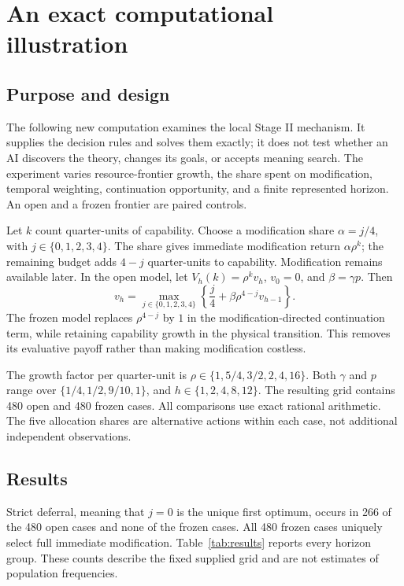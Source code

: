 \documentclass[11pt,a4paper]{article}
\begin{document}
\section{An exact computational illustration}
\subsection{Purpose and design}
The following new computation examines the local Stage II mechanism. It supplies the decision rules and solves them exactly; it does not test whether an AI discovers the theory, changes its goals, or accepts meaning search. The experiment varies resource-frontier growth, the share spent on modification, temporal weighting, continuation opportunity, and a finite represented horizon. An open and a frozen frontier are paired controls.

Let $k$ count quarter-units of capability. Choose a modification share $\alpha=j/4$, with $j\in\{0,1,2,3,4\}$. The share gives immediate modification return $\alpha\rho^k$; the remaining budget adds $4-j$ quarter-units to capability. Modification remains available later. In the open model, let $V_h(k)=\rho^k v_h$, $v_0=0$, and $\beta=\gamma p$. Then
\begin{equation}
 v_h=\max_{j\in\{0,1,2,3,4\}}
 \left\{\frac{j}{4}+\beta\rho^{4-j}v_{h-1}\right\}.
 \label{eq:sweep}
\end{equation}
The frozen model replaces $\rho^{4-j}$ by $1$ in the modification-directed continuation term, while retaining capability growth in the physical transition. This removes its evaluative payoff rather than making modification costless.

The growth factor per quarter-unit is $\rho\in\{1,5/4,3/2,2,4,16\}$. Both $\gamma$ and $p$ range over $\{1/4,1/2,9/10,1\}$, and $h\in\{1,2,4,8,12\}$. The resulting grid contains 480 open and 480 frozen cases. All comparisons use exact rational arithmetic. The five allocation shares are alternative actions within each case, not additional independent observations.

\subsection{Results}
Strict deferral, meaning that $j=0$ is the unique first optimum, occurs in 266 of the 480 open cases and none of the frozen cases. All 480 frozen cases uniquely select full immediate modification. Table~\ref{tab:results} reports every horizon group. These counts describe the fixed supplied grid and are not estimates of population frequencies.
\end{document}
